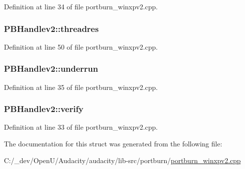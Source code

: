 Definition at line 34 of file portburn\+\_\+winxpv2.\+cpp.

\subsubsection[{\texorpdfstring{threadres}{threadres}}]{ P\+B\+Handlev2\+::threadres}\hypertarget{struct_p_b_handlev2_a2dedb4363dacef0ed4fd1716f8674008}{}\label{struct_p_b_handlev2_a2dedb4363dacef0ed4fd1716f8674008}


Definition at line 50 of file portburn\+\_\+winxpv2.\+cpp.

\subsubsection[{\texorpdfstring{underrun}{underrun}}]{ P\+B\+Handlev2\+::underrun}\hypertarget{struct_p_b_handlev2_aa3ec21e1d20dc709aac04ce7f8079f72}{}\label{struct_p_b_handlev2_aa3ec21e1d20dc709aac04ce7f8079f72}


Definition at line 35 of file portburn\+\_\+winxpv2.\+cpp.

\subsubsection[{\texorpdfstring{verify}{verify}}]{ P\+B\+Handlev2\+::verify}\hypertarget{struct_p_b_handlev2_a0ef27b9e8f1195216ae6759dc1e1192b}{}\label{struct_p_b_handlev2_a0ef27b9e8f1195216ae6759dc1e1192b}


Definition at line 33 of file portburn\+\_\+winxpv2.\+cpp.



The documentation for this struct was generated from the following file\+:\begin{DoxyCompactItemize}
\item 
C\+:/\+\_\+dev/\+Open\+U/\+Audacity/audacity/lib-\/src/portburn/\hyperlink{portburn__winxpv2_8cpp}{portburn\+\_\+winxpv2.\+cpp}\end{DoxyCompactItemize}
